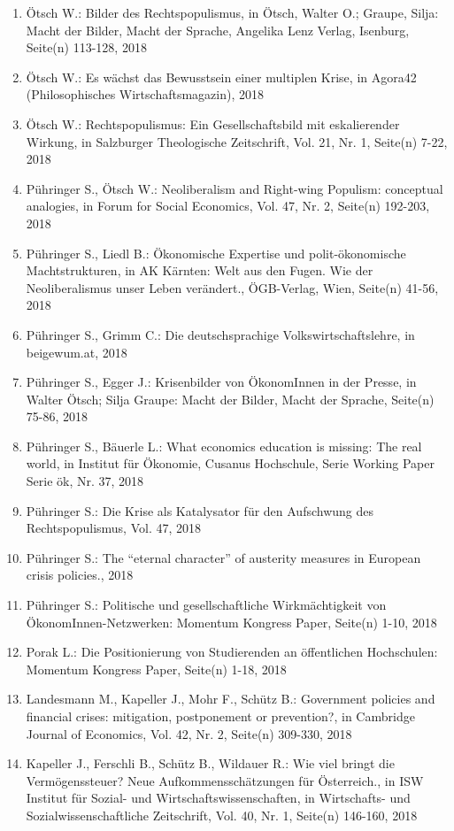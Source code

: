 \begin{enumerate}
	 \item Ötsch W.: Bilder des Rechtspopulismus, in Ötsch, Walter O.; Graupe, Silja: Macht der Bilder, Macht der Sprache, Angelika Lenz Verlag, Isenburg, Seite(n) 113-128, 2018
	 \item Ötsch W.: Es wächst das Bewusstsein einer multiplen Krise, in Agora42 (Philosophisches Wirtschaftsmagazin), 2018
	 \item Ötsch W.: Rechtspopulismus: Ein Gesellschaftsbild mit eskalierender Wirkung, in Salzburger Theologische Zeitschrift, Vol. 21, Nr. 1, Seite(n) 7-22, 2018
	 \item Pühringer S., Ötsch W.: Neoliberalism and Right-wing Populism: conceptual analogies, in Forum for Social Economics, Vol. 47, Nr. 2, Seite(n) 192-203, 2018
	 \item Pühringer S., Liedl B.: Ökonomische Expertise und polit-ökonomische Machtstrukturen, in AK Kärnten: Welt aus den Fugen. Wie der Neoliberalismus unser Leben verändert., ÖGB-Verlag, Wien, Seite(n) 41-56, 2018
	 \item Pühringer S., Grimm C.: Die deutschsprachige Volkswirtschaftslehre, in beigewum.at, 2018
	 \item Pühringer S., Egger J.: Krisenbilder von ÖkonomInnen in der Presse, in Walter Ötsch; Silja Graupe: Macht der Bilder, Macht der Sprache, Seite(n) 75-86, 2018
	 \item Pühringer S., Bäuerle L.: What economics education is missing: The real world, in Institut für Ökonomie, Cusanus Hochschule, Serie Working Paper Serie ök, Nr. 37, 2018
	 \item Pühringer S.: Die Krise als Katalysator für den Aufschwung des Rechtspopulismus, Vol. 47, 2018
	 \item Pühringer S.: The “eternal character” of austerity measures in European crisis policies., 2018
	 \item Pühringer S.: Politische und gesellschaftliche Wirkmächtigkeit von ÖkonomInnen-Netzwerken: Momentum Kongress Paper, Seite(n) 1-10, 2018
	 \item Porak L.: Die Positionierung von Studierenden an öffentlichen Hochschulen: Momentum Kongress Paper, Seite(n) 1-18, 2018
	 \item Landesmann M., Kapeller J., Mohr F., Schütz B.: Government policies and financial crises: mitigation, postponement or prevention?, in Cambridge Journal of Economics, Vol. 42, Nr. 2, Seite(n) 309-330, 2018
	 \item Kapeller J., Ferschli B., Schütz B., Wildauer R.: Wie viel bringt die Vermögenssteuer? Neue Aufkommensschätzungen für Österreich., in ISW Institut für Sozial- und Wirtschaftswissenschaften, in Wirtschafts- und Sozialwissenschaftliche Zeitschrift, Vol. 40, Nr. 1, Seite(n) 146-160, 2018

\end{enumerate}
